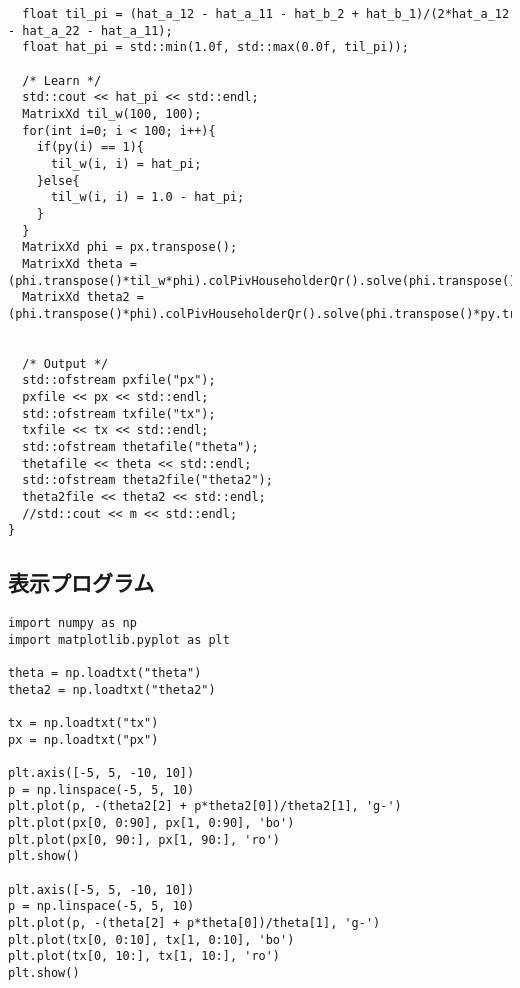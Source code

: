 \documentclass[9pt]{ltjsarticle}
\begin{document}
\begin{verbatim}
  float til_pi = (hat_a_12 - hat_a_11 - hat_b_2 + hat_b_1)/(2*hat_a_12 - hat_a_22 - hat_a_11);
  float hat_pi = std::min(1.0f, std::max(0.0f, til_pi));

  /* Learn */
  std::cout << hat_pi << std::endl;
  MatrixXd til_w(100, 100);
  for(int i=0; i < 100; i++){
    if(py(i) == 1){
      til_w(i, i) = hat_pi;
    }else{
      til_w(i, i) = 1.0 - hat_pi;
    }
  }
  MatrixXd phi = px.transpose();
  MatrixXd theta = (phi.transpose()*til_w*phi).colPivHouseholderQr().solve(phi.transpose()*til_w*py.transpose());
  MatrixXd theta2 = (phi.transpose()*phi).colPivHouseholderQr().solve(phi.transpose()*py.transpose());


  /* Output */
  std::ofstream pxfile("px");
  pxfile << px << std::endl;
  std::ofstream txfile("tx");
  txfile << tx << std::endl;
  std::ofstream thetafile("theta");
  thetafile << theta << std::endl;
  std::ofstream theta2file("theta2");
  theta2file << theta2 << std::endl;
  //std::cout << m << std::endl;
}
\end{verbatim}
\normalsize
\subsection*{表示プログラム}
\tiny
\begin{verbatim}
import numpy as np
import matplotlib.pyplot as plt

theta = np.loadtxt("theta")
theta2 = np.loadtxt("theta2")

tx = np.loadtxt("tx")
px = np.loadtxt("px")

plt.axis([-5, 5, -10, 10])
p = np.linspace(-5, 5, 10)
plt.plot(p, -(theta2[2] + p*theta2[0])/theta2[1], 'g-')   
plt.plot(px[0, 0:90], px[1, 0:90], 'bo')   
plt.plot(px[0, 90:], px[1, 90:], 'ro')   
plt.show()

plt.axis([-5, 5, -10, 10])
p = np.linspace(-5, 5, 10)
plt.plot(p, -(theta[2] + p*theta[0])/theta[1], 'g-')   
plt.plot(tx[0, 0:10], tx[1, 0:10], 'bo')   
plt.plot(tx[0, 10:], tx[1, 10:], 'ro')   
plt.show()
\end{verbatim}

\normalsize
\end{document}
